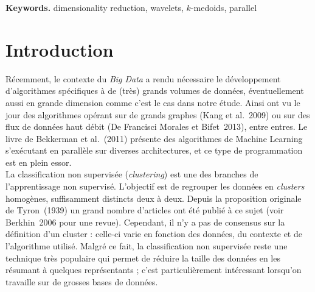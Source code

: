 \documentclass[12pt]{article}
\begin{document}
{\bf Keywords.} dimensionality reduction, wavelets, $k$-medoids, parallel



\section{Introduction}


Récemment, le contexte du \textit{Big Data} a rendu nécessaire le développement d'algorithmes spécifiques à de (très) 
grands volumes de données, éventuellement aussi en grande dimension comme c'est le cas dans notre étude. 
Ainsi ont vu le jour des algorithmes opérant sur de grands graphes (Kang et al.~2009) ou sur des flux de données haut débit (De Francisci Morales et Bifet~2013), entre entres. 
Le livre de Bekkerman et al.~(2011) présente des algorithmes de Machine Learning s'exécutant en parallèle sur diverses architectures, et 
ce type de programmation est en plein essor.\\

\noindent La classification non supervisée (\textit{clustering}) est une des branches de l'apprentissage non supervisé. 
L'objectif est de regrouper les données en \textit{clusters} homogènes, suffisamment distincts deux à deux. 
Depuis la proposition originale de Tyron~(1939) un grand nombre d'articles ont été publié à ce sujet (voir Berkhin~2006 pour une revue). 
Cependant, il n'y a pas de consensus sur la définition d'un cluster : celle-ci varie en fonction des données, du contexte et de l'algorithme utilisé. 
Malgré ce fait, la classification non supervisée reste une technique très populaire qui permet 
de réduire la taille des données en les résumant à quelques représentants ; c'est particulièrement intéressant lorsqu'on travaille sur de grosses bases de données.\\
\end{document}

